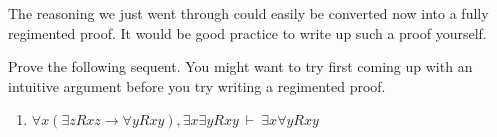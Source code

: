 The reasoning we just went through could easily be converted now into
a fully regimented proof.  It would be good practice to write up such
a proof yourself.

                              
\begin{exercises} Prove the following sequent.  You might want to try
  first coming up with an intuitive argument before you try writing a
  regimented proof.
   \begin{enumerate}
 \item $\forall x(\exists zRxz\to \forall yRxy ),\exists x\exists yRxy\:\vdash\:\exists x\forall yRxy$
 \end{enumerate} \end{exercises}



